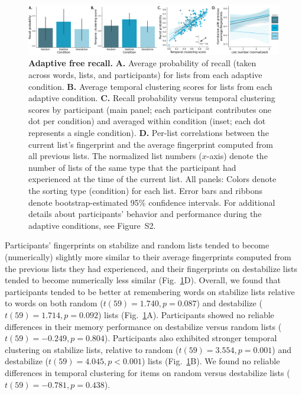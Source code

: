 \documentclass[11pt]{article}
\newcommand{\dynamicsAdaptive}{S2}
\begin{document}
\begin{figure} 
    \centering

    \includegraphics[width=\textwidth]{figures/adaptive_results}
        
        \caption{\textbf{Adaptive free recall.} \textbf{A.} Average probability
        of recall (taken across words, lists, and participants) for lists from
        each adaptive condition. \textbf{B.} Average temporal clustering scores
        for lists from each adaptive condition. \textbf{C.} Recall probability
        versus temporal clustering scores by participant (main panel; each
        participant contributes one dot per condition) and averaged within
        condition (inset; each dot represents a single condition). \textbf{D.}
        Per-list correlations between the current list's fingerprint and the
        average fingerprint computed from all previous lists. The normalized
        list numbers ($x$-axis) denote the number of lists of the same type
        that the participant had experienced at the time of the current list.
        All panels: Colors denote the sorting type (condition) for each list.
        Error bars and ribbons denote bootstrap-estimated 95\% confidence
        intervals. For additional details about participants' behavior and
        performance during the adaptive conditions, see
        Figure~\dynamicsAdaptive.}

    \label{fig:adaptive}
\end{figure}

Participants' fingerprints on stabilize and random lists tended to become
(numerically) slightly more similar to their average fingerprints computed from
the previous lists they had experienced, and their fingerprints on destabilize
lists tended to become numerically less similar (Fig.~\ref{fig:adaptive}D).
Overall, we found that participants tended to be better at remembering words on
stabilize lists relative to words on both random ($t(59) = 1.740, p = 0.087$)
and destabilize ($t(59) = 1.714, p = 0.092$) lists (Fig.~\ref{fig:adaptive}A).
Participants showed no reliable differences in their memory performance on
destabilize versus random lists ($t(59) = -0.249, p = 0.804$). Participants
also exhibited stronger temporal clustering on stabilize lists, relative to
random ($t(59) = 3.554, p = 0.001$) and destabilize ($t(59) = 4.045, p <
0.001$) lists (Fig.~\ref{fig:adaptive}B). We found no reliable differences in
temporal clustering for items on random versus destabilize lists ($t(59) =
-0.781, p = 0.438$).
\end{document}

